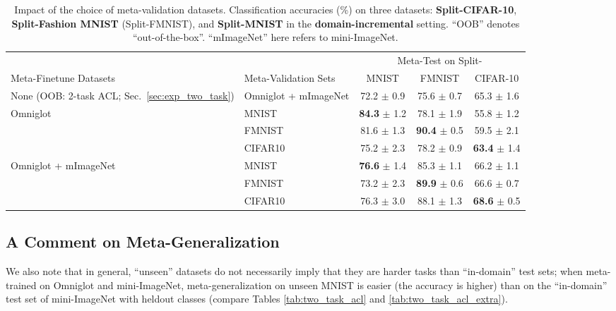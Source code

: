 \documentclass{article}
\begin{document}
\begin{table}[t]
\small
\setlength{\tabcolsep}{0.3em}
\caption{Impact of the choice of meta-validation datasets. Classification accuracies (\%) on three datasets: \textbf{Split-CIFAR-10}, \textbf{Split-Fashion MNIST} (Split-FMNIST), and \textbf{Split-MNIST} in the \textbf{domain-incremental} setting.
``OOB'' denotes ``out-of-the-box''. ``mImageNet'' here refers to mini-ImageNet.}
\vspace{-2mm}
\label{tab:metaval}
\begin{center}
\begin{tabular}{llccc}
\toprule
 & &  \multicolumn{3}{c}{Meta-Test on Split-} \\ \cmidrule(lr){3-5} 
 Meta-Finetune Datasets & Meta-Validation Sets & MNIST & FMNIST & CIFAR-10 \\ \midrule 
 None (OOB: 2-task ACL; Sec.~\ref{sec:exp_two_task}) & Omniglot + mImageNet & 72.2 $\pm$ 0.9 & 75.6 $\pm$ 0.7 &  65.3 $\pm$ 1.6 \\ \midrule
 Omniglot & MNIST & \textbf{84.3} $\pm$ 1.2 & 78.1 $\pm$ 1.9 & 55.8 $\pm$ 
 1.2 \\ 
   & FMNIST & 81.6 $\pm$ 1.3 & \textbf{90.4} $\pm$  0.5 & 59.5 $\pm$ 2.1 \\ 
   & CIFAR10 & 75.2 $\pm$ 2.3 & 78.2 $\pm$ 0.9 & \textbf{63.4} $\pm$ 1.4 \\ \midrule
 Omniglot + mImageNet & MNIST & \textbf{76.6} $\pm$ 1.4 & 85.3 $\pm$ 1.1 & 66.2 $\pm$ 1.1 \\ 
  & FMNIST & 73.2 $\pm$ 2.3 & \textbf{89.9} $\pm$ 0.6 & 66.6 $\pm$  0.7 \\ 
& CIFAR10 & 76.3 $\pm$ 3.0 & 88.1 $\pm$ 1.3 & \textbf{68.6} $\pm$ 0.5 \\ 
\bottomrule
\end{tabular}
\end{center}

\end{table}

\subsection{A Comment on Meta-Generalization}
We also note that in general, ``unseen'' datasets do not necessarily imply that they are harder tasks than ``in-domain'' test sets; when meta-trained on Omniglot and mini-ImageNet, meta-generalization on unseen MNIST is easier (the accuracy is higher) than on the ``in-domain'' test set of mini-ImageNet with heldout classes (compare Tables \ref{tab:two_task_acl} and \ref{tab:two_task_acl_extra}).
\end{document}
